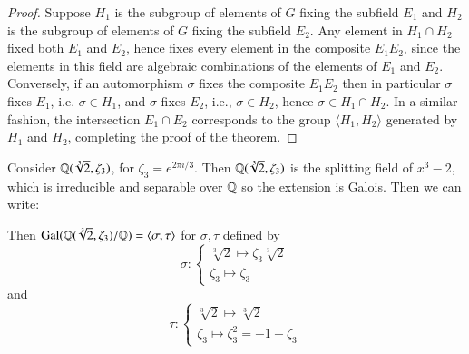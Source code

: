\documentclass[12pt, a4paper, oneside, openright, titlepage]{book}
\begin{document}
\begin{proof}
    Suppose $H_1$ is the subgroup of elements of $G$ fixing the subfield $E_1$ and $H_2$ is the subgroup of elements of $G$ fixing the subfield $E_2$. Any element in $H_1\cap H_2$ fixed both $E_1$ and $E_2$, hence fixes every element in the composite $E_1E_2$, since the elements in this field are algebraic combinations of the elements of $E_1$ and $E_2$. Conversely, if an automorphism $\sigma$ fixes the composite $E_1E_2$ then in particular $\sigma$ fixes $E_1$, i.e. $\sigma \in H_1$, and $\sigma$ fixes $E_2$, i.e., $\sigma \in H_2$, hence $\sigma \in H_1\cap H_2$. In a similar fashion, the intersection $E_1\cap E_2$ corresponds to the group $\langle H_1,H_2\rangle$ generated by $H_1$ and $H_2$, completing the proof of the theorem.
\end{proof}


\begin{eg}
    Consider $\mathbb Q(\sqrt[3]{2},\zeta_3)$, for $\zeta_3 = e^{2\pi i/3}$. Then $\mathbb Q(\sqrt[3]{2},\zeta_3)$ is the splitting field of $x^3-2$, which is irreducible and separable over $\mathbb Q$ so the extension is Galois. Then we can write: 
    \begin{center}
    \end{center}
    Then $\text{Gal}(\mathbb{Q}(\sqrt[3]{2},\zeta_3)/\mathbb Q) = \langle \sigma,\tau\rangle$ for $\sigma,\tau$ defined by \begin{equation*}
        \sigma:\left\{\begin{array}{c} \sqrt[3]{2} \mapsto \zeta_3\sqrt[3]{2} \\ \zeta_3\mapsto \zeta_3 \end{array}\right.
    \end{equation*}
    and \begin{equation*}
        \tau:\left\{\begin{array}{c} \sqrt[3]{2} \mapsto \sqrt[3]{2} \\ \zeta_3\mapsto \zeta_3^2 = -1-\zeta_3 \end{array}\right.

\end{equation*}
\end{eg}
\end{document}
